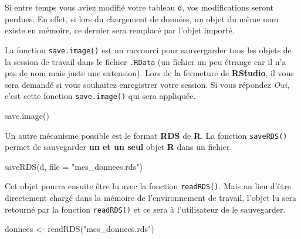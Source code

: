 \documentclass[
  letterpaper,
  DIV=11,
  numbers=noendperiod,
  oneside]{scrreprt}
\newenvironment{Shaded}{\begin{snugshade}}{\end{snugshade}}
\newcommand{\AttributeTok}[1]{\textcolor[rgb]{0.40,0.45,0.13}{#1}}
\newcommand{\FunctionTok}[1]{\textcolor[rgb]{0.28,0.35,0.67}{#1}}
\newcommand{\NormalTok}[1]{\textcolor[rgb]{0.00,0.23,0.31}{#1}}
\newcommand{\OtherTok}[1]{\textcolor[rgb]{0.00,0.23,0.31}{#1}}
\newcommand{\StringTok}[1]{\textcolor[rgb]{0.13,0.47,0.30}{#1}}
\begin{document}
\begin{tcolorbox}[enhanced jigsaw, colbacktitle=quarto-callout-caution-color!10!white, opacityback=0, toprule=.15mm, colback=white, coltitle=black, bottomtitle=1mm, toptitle=1mm, titlerule=0mm, rightrule=.15mm, title=\textcolor{quarto-callout-caution-color}{\faFire}\hspace{0.5em}{Mise en garde}, breakable, bottomrule=.15mm, opacitybacktitle=0.6, arc=.35mm, left=2mm, leftrule=.75mm, colframe=quarto-callout-caution-color-frame]

Si entre temps vous aviez modifié votre tableau \texttt{d}, vos
modifications seront perdues. En effet, si lors du chargement de
données, un objet du même nom existe en mémoire, ce dernier sera
remplacé par l'objet importé.

\end{tcolorbox}

La fonction \texttt{save.image()} est un raccourci pour sauvergarder
tous les objets de la session de travail dans le fichier \texttt{.RData}
(un fichier un peu étrange car il n'a pas de nom mais juste une
extension). Lors de la fermeture de \textbf{RStudio}, il vous sera
demandé si vous souhaitez enregistrer votre session. Si vous répondez
\emph{Oui}, c'est cette fonction \texttt{save.image()} qui sera
appliquée.

\begin{Shaded}
\begin{Highlighting}[]
\FunctionTok{save.image}\NormalTok{()}
\end{Highlighting}
\end{Shaded}

Un autre mécanisme possible est le format \textbf{RDS} de \textbf{R}. La
fonction \texttt{saveRDS()} permet de sauvegarder \textbf{un et un seul}
objet \textbf{R} dans un fichier.

\begin{Shaded}
\begin{Highlighting}[]
\FunctionTok{saveRDS}\NormalTok{(d, }\AttributeTok{file =} \StringTok{"mes\_donnees.rds"}\NormalTok{)}
\end{Highlighting}
\end{Shaded}

Cet objet pourra ensuite être lu avec la fonction \texttt{readRDS()}.
Mais au lieu d'être directement chargé dans la mémoire de
l'environnement de travail, l'objet lu sera retourné par la fonction
\texttt{readRDS()} et ce sera à l'utilisateur de le sauvegarder.

\begin{Shaded}
\begin{Highlighting}[]
\NormalTok{donnees }\OtherTok{\textless{}{-}} \FunctionTok{readRDS}\NormalTok{(}\StringTok{"mes\_donnees.rds"}\NormalTok{)}
\end{Highlighting}
\end{Shaded}
\end{document}
